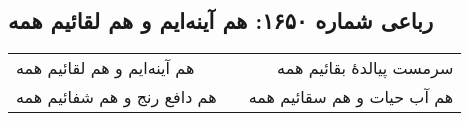 \begin{center}
\section*{رباعی شماره ۱۶۵۰: هم آینه‌ایم و هم لقائیم همه}
\label{sec:1650}
\begin{longtable}{l p{0.5cm} r}
هم آینه‌ایم و هم لقائیم همه
&&
سرمست پیالدهٔ بقائیم همه
\\
هم دافع رنج و هم شفائیم همه
&&
هم آب حیات و هم سقائیم همه
\\
\end{longtable}
\end{center}
